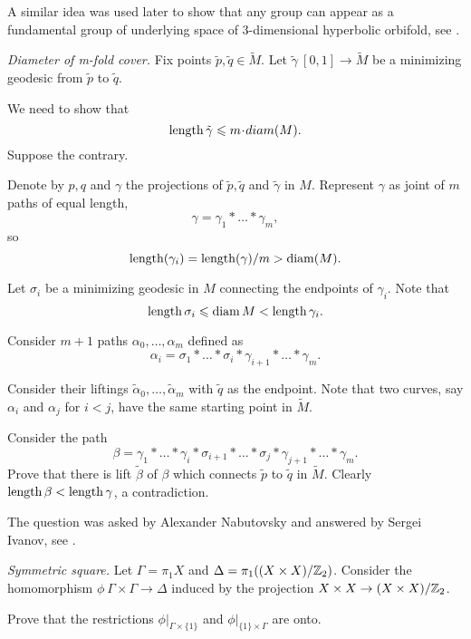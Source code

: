 A similar idea was used later to show that any group can appear as a fundamental group of underlying space of 3-dimensional hyperbolic orbifold, see \cite{panov-petrunin-telescopic}.





\textit{Diameter of \textit{m}-fold cover.}
Fix points $\tilde p,\tilde q\in\tilde M$.
Let  
$\tilde\gamma\:[0,1]\to \tilde M$ be a minimizing geodesic from $\tilde p$ to $\tilde q$. 

We need to show that 
$$\length \tilde\gamma\le m\cdot diam(M).$$ 
Suppose the contrary.

Denote by $p,q$ and $\gamma$ the projections of $\tilde p,\tilde q$ and $\tilde \gamma$ in $M$. 
Represent $\gamma$
as joint of $m$ paths of equal length,
\[\gamma=\gamma_1{*}\dots{*}\gamma_m,\] 
so
\[\operatorname{\rm length}(\gamma_i)=\operatorname{\rm length}(\gamma)/m>\operatorname{\rm diam}(M).\] 

Let $\sigma_i$ be a minimizing geodesic in $M$ connecting the endpoints of $\gamma_i$. 
Note that 
$$\operatorname{\rm length}\sigma_i\leqslant \operatorname{\rm diam} M< \operatorname{\rm length}\gamma_i.$$ 

Consider $m+1$ paths $\alpha_0,\dots,\alpha_m$ defined as 
\[\alpha_i=\sigma_1{*}\dots{*}\sigma_i{*}\gamma_{i+1}{*}\dots{*}\gamma_m.\]

Consider their liftings $\tilde\alpha_0,\dots,\tilde\alpha_m$ 
with $\tilde q$ as the endpoint.
Note that two curves, say $\alpha_i$ and $\alpha_j$ for $i<j$, 
have the same starting point in $\tilde M$.

Consider the path
\[\beta=\gamma_1{*}\dots{*}\gamma_i{*}\sigma_{i+1}{*}\dots{*}\sigma_j{*}\gamma_{j+1}{*}\dots{*}\gamma_m.\]
Prove that there is lift $\tilde\beta$ of $\beta$ 
which connects $\tilde p$ to $\tilde q$ in $\tilde M$.
Clearly $\operatorname{\rm length} \beta<\operatorname{\rm length} \gamma$, a contradiction.

The question was asked by Alexander  Nabutovsky
and answered by Sergei Ivanov, 
see \cite{ivanov}.



\textit{Symmetric square.}
Let $\Gamma=\pi_1 X$ and $\Delta=\pi_1((X\times X)/\mathbb{Z}_2)$.
Consider the homomorphism $\phi\:\Gamma\times \Gamma\to \Delta$
induced by the projection $X\times X\to (X\times X)/\mathbb{Z}_2$.

Prove that the restrictions $\phi|_{\Gamma\times \{1\}}$ and $\phi|_{\{1\}\times\Gamma}$
are onto.

